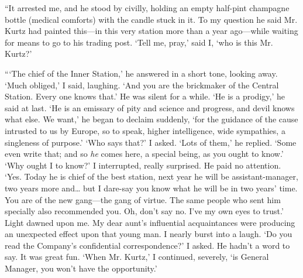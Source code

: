 \documentclass[12pt]{report}
\begin{document}
``It arrested me, and he stood by civilly, holding an empty half-pint
champagne bottle (medical comforts) with the candle stuck in it. To my
question he said Mr. Kurtz had painted this---in this very station more
than a year ago---while waiting for means to go to his trading post.
`Tell me, pray,' said I, `who is this Mr. Kurtz?'

```The chief of the Inner Station,' he answered in a short tone, looking
away. `Much obliged,' I said, laughing. `And you are the brickmaker of
the Central Station. Every one knows that.' He was silent for a while.
`He is a prodigy,' he said at last. `He is an emissary of pity and
science and progress, and devil knows what else. We want,' he began to
declaim suddenly, `for the guidance of the cause intrusted to us by
Europe, so to speak, higher intelligence, wide sympathies, a singleness
of purpose.' `Who says that?' I asked. `Lots of them,' he replied. `Some
even write that; and so \emph{he} comes here, a special being, as you
ought to know.' `Why ought I to know?' I interrupted, really surprised.
He paid no attention. `Yes. Today he is chief of the best station, next
year he will be assistant-manager, two years more and\ldots{} but I
dare-say you know what he will be in two years' time. You are of the new
gang---the gang of virtue. The same people who sent him specially also
recommended you. Oh, don't say no. I've my own eyes to trust.' Light
dawned upon me. My dear aunt's influential acquaintances were producing
an unexpected effect upon that young man. I nearly burst into a laugh.
`Do you read the Company's confidential correspondence?' I asked. He
hadn't a word to say. It was great fun. `When Mr. Kurtz,' I continued,
severely, `is General Manager, you won't have the opportunity.'
\end{document}
